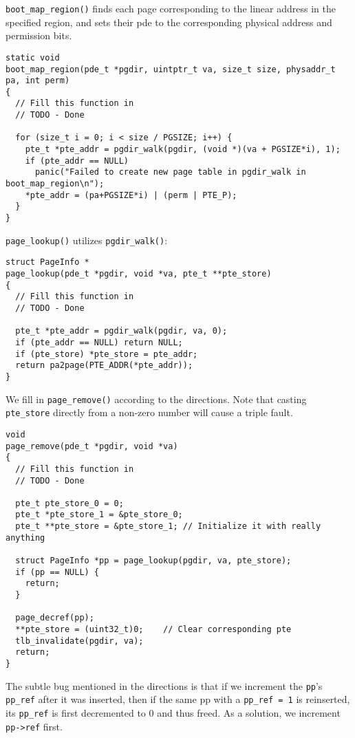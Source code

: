 \documentclass[]{article}
\begin{document}
\verb|boot_map_region()| finds each page corresponding to the linear address in the specified region, and sets their pde to the corresponding physical address and permission bits.

\begin{verbatim}
static void
boot_map_region(pde_t *pgdir, uintptr_t va, size_t size, physaddr_t pa, int perm)
{
  // Fill this function in
  // TODO - Done

  for (size_t i = 0; i < size / PGSIZE; i++) {
    pte_t *pte_addr = pgdir_walk(pgdir, (void *)(va + PGSIZE*i), 1);
    if (pte_addr == NULL)
      panic("Failed to create new page table in pgdir_walk in boot_map_region\n");
    *pte_addr = (pa+PGSIZE*i) | (perm | PTE_P);
  }
}
\end{verbatim}

\verb|page_lookup()| utilizes \verb|pgdir_walk()|:

\begin{verbatim}
struct PageInfo *
page_lookup(pde_t *pgdir, void *va, pte_t **pte_store)
{
  // Fill this function in
  // TODO - Done
  
  pte_t *pte_addr = pgdir_walk(pgdir, va, 0);
  if (pte_addr == NULL) return NULL;
  if (pte_store) *pte_store = pte_addr;
  return pa2page(PTE_ADDR(*pte_addr));
}
\end{verbatim}

We fill in \verb|page_remove()| according to the directions. Note that casting \verb|pte_store| directly from a non-zero number will cause a triple fault.

\begin{verbatim}
void
page_remove(pde_t *pgdir, void *va)
{
  // Fill this function in
  // TODO - Done

  pte_t pte_store_0 = 0;
  pte_t *pte_store_1 = &pte_store_0;
  pte_t **pte_store = &pte_store_1; // Initialize it with really anything

  struct PageInfo *pp = page_lookup(pgdir, va, pte_store);
  if (pp == NULL) {
    return;
  }

  page_decref(pp);
  **pte_store = (uint32_t)0;	// Clear corresponding pte
  tlb_invalidate(pgdir, va); 
  return;
}
\end{verbatim}

The subtle bug mentioned in the directions is that if we increment the \verb|pp|'s \verb|pp_ref| after it was inserted, then if the same pp with a \verb|pp_ref = 1| is reinserted, its \verb|pp_ref| is first decremented to 0 and thus freed. As a solution, we increment \verb|pp->ref| first.
\end{document}
